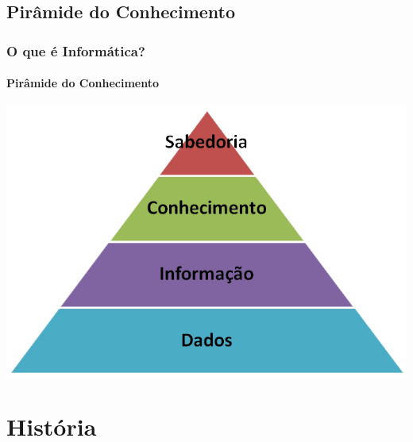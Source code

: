 \documentclass[12pt,a4paper,final]{beamer}
\begin{document}
        \subsection{Pirâmide do Conhecimento}
            \begin{frame}
                \frametitle{O que é Informática?}
                \framesubtitle{Pirâmide do Conhecimento}
                    \begin{block}{}
                         \centering
                         \includegraphics[scale=0.5]{Imagens/piramede.png}
                    \end{block}
	        \end{frame}
    \section{História}
\end{document}
